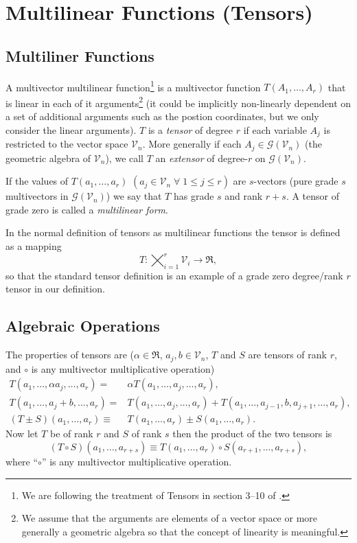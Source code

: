 \documentclass[12pt,twoside,openright]{memoir}
\newcommand{\lp}{\left (}
\newcommand{\rp}{\right )}
\newcommand{\f}[2]{{#1}\lp {#2} \rp}
\newcommand{\be}{\begin{equation}}
\newcommand{\ee}{\end{equation}}
\begin{document}
\section{Multilinear Functions (Tensors)}\label{MLtrans}

\subsection{Multiliner Functions}
A multivector multilinear function\footnote{We are following the treatment of Tensors in section 3--10 of \cite{Hestenes}.} is a 
multivector function $\f{T}{A_{1},\dots,A_{r}}$ that is linear in each of it arguments\footnote{We assume that the arguments 
are elements of a vector space or more generally a geometric algebra so that the concept of linearity is meaningful.} 
(it could be implicitly non-linearly dependent 
on a set of additional arguments such as the postion coordinates, but we only consider the linear arguments). $T$ is a \emph{tensor}
of degree $r$ if each variable $A_{j}$ is restricted to the vector space $\mathcal{V}_{n}$.  More generally if each 
$A_{j}\in\f{\mathcal{G}}{\mathcal{V}_{n}}$ (the geometric algebra of $\mathcal{V}_{n}$), we call $T$ an \emph{extensor} of
degree-$r$ on $\f{\mathcal{G}}{\mathcal{V}_{n}}$.

If the values of $\f{T}{a_{1},\dots,a_{r}}$ $\lp a_{j}\in\mathcal{V}_{n}\;\forall\; 1\le j \le r \rp$ are $s$-vectors 
(pure grade $s$ multivectors in 
$\f{\mathcal{G}}{\mathcal{V}_{n}}$) we say that $T$ has grade $s$ and rank $r+s$.  A tensor of grade zero is called a
\emph{multilinear form}.

In the normal definition of tensors as multilinear functions the tensor is defined as a mapping 
$$T:\bigtimes_{i=1}^{r}\mathcal{V}_{i}\rightarrow\Re,$$ so that the standard tensor definition is an example of a grade zero
degree/rank $r$ tensor in our definition.

\subsection{Algebraic Operations}
The properties of tensors are ($\alpha\in\Re$, $a_{j},b\in\mathcal{V}_{n}$, $T$ and $S$ are tensors of rank $r$,
and $\circ$ is any multivector multiplicative operation)
\begin{align}
	\f{T}{a_{1},\dots,\alpha a_{j},\dots,a_{r}} =& \alpha\f{T}{a_{1},\dots,a_{j},\dots,a_{r}}, \\
	\f{T}{a_{1},\dots,a_{j}+b,\dots,a_{r}} =& \f{T}{a_{1},\dots,a_{j},\dots,a_{r}}+ \f{T}{a_{1},\dots,a_{j-1},b,a_{j+1},\dots,a_{r}}, \\
	\f{\lp T\pm S\rp}{a_{1},\dots,a_{r}} \equiv& \f{T}{a_{1},\dots,a_{r}}\pm\f{S}{a_{1},\dots,a_{r}}.
\end{align}
Now let $T$ be of rank $r$ and $S$ of rank $s$ then the product of the two tensors is
\be
	\f{\lp T\circ S\rp}{a_{1},\dots,a_{r+s}} \equiv \f{T}{a_{1},\dots,a_{r}}\circ\f{S}{a_{r+1},\dots,a_{r+s}},
\ee
where ``$\circ$'' is any multivector multiplicative operation.
\end{document}

